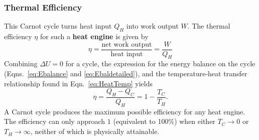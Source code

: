 \subsubsection{Thermal Efficiency}
This Carnot cycle turns heat input $Q_H$ into work output $W$. The thermal efficiency $\eta$ for such a \textbf{heat engine} is given by 
\begin{equation}
\eta = \frac{\text{net work output}}{\text{heat input}} = \frac{W}{Q_H}
\end{equation}
Combining $\Delta U = 0$ for a cycle, the expression for the energy balance on the cycle (Eqns.~\eqref{eq:Ebalance} and \eqref{eq:Ebaldetailed}), and the temperature-heat transfer relationship found in Eqn.~\eqref{eq:HeatTemp} yields
\begin{equation}
\eta = \frac{Q_H - Q_C}{Q_H} = 1-\frac{T_C}{T_H}.
\end{equation}
A Carnot cycle produces the maximum possible efficiency for any heat engine. The efficiency can only approach $1$ (equivalent to 100\%) when either $T_C \to 0$ or $T_H \to \infty$, neither of which is physically attainable. 
